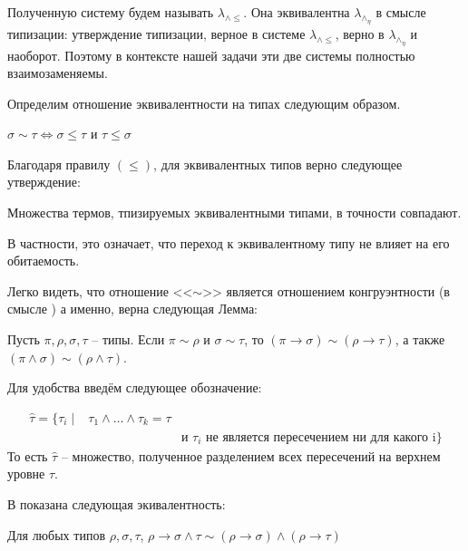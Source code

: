 \documentclass[../main.tex]{subfiles}
\begin{document}
Полученную систему будем называть $\lambda_{\wedge \leqslant}$. Она эквивалентна $\lambda_\wedge_\eta$ в смысле типизации: утверждение типизации, верное в системе  $\lambda_{\wedge \leqslant}$, верно в $\lambda_\wedge_\eta$ и наоборот. Поэтому в контексте нашей задачи эти две системы полностью взаимозаменяемы.

Определим отношение эквивалентности на типах следующим образом. 

\begin{definition}
$\sigma \sim \tau \iff \sigma \leqslant \tau$ и $\tau \leqslant \sigma$
\end{definition}

Благодаря правилу $(\leqslant)$, для эквивалентных типов верно следующее утверждение:

\begin{lemma}
Множества термов, тпизируемых эквивалентными типами, в точности совпадают.
\end{lemma}

В частности, это означает, что переход к эквивалентному типу не влияет на его обитаемость.

Легко видеть, что отношение <<$\sim$>> является отношением конгруэнтности (в смысле \cite{barendregt_2013}) а именно, верна следующая Лемма:
\begin{lemma}
Пусть $\pi, \rho, \sigma, \tau$ -- типы. 
Если $\pi \sim \rho$ и $\sigma \sim \tau$, то $(\pi \to \sigma) \sim (\rho \to \tau)$, а также $(\pi \wedge \sigma) \sim (\rho \wedge \tau)$.
\end{lemma}



Для удобства введём следующее обозначение: 
\begin{definition}
\begin{align*}
\hat{\tau} = \{\tau_i \mid & \tau_1 \wedge \dots \wedge \tau_k = \tau \\
                               && \text{и $\tau_i$ не является пересечением ни для какого i} \}
\end{align*}
То есть $\hat{\tau}$ -- множество, полученное разделением всех пересечений на верхнем уровне $\tau$.
\end{definition}


В \cite{hindley_1982} показана следующая экивалентность: 
\begin{lemma} Для любых типов $\rho, \sigma, \tau$, 
$\rho \to \sigma \wedge \tau \sim (\rho \to \sigma) \wedge (\rho \to \tau)$
\end{lemma}
\end{document}
